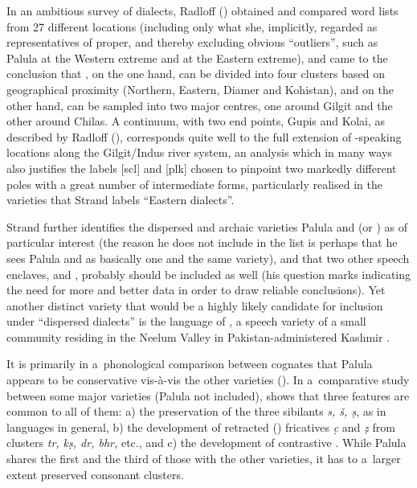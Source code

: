 In an ambitious survey of \iliShina dialects, Radloff (\citeyear{radloff1992}) obtained and compared word lists from 27 different locations (including only what she, implicitly, regarded as representatives of \iliShina proper, and thereby excluding obvious ``outliers'', such as Palula at the Western extreme and \iliBrokskat at the Eastern extreme), and came to the conclusion that \iliShina, on the one hand, can be divided into four clusters based on geographical proximity (Northern, Eastern, Diamer and Kohistan), and on the other hand, can be sampled into two major centres, one around Gilgit and the other around Chilas. A continuum, with two end points, Gupis and Kolai, as described by Radloff (\citeyear[132]{radloff1992}), corresponds quite well to the full extension of \iliShina-speaking locations along the Gilgit/Indus river system, an analysis which in many ways also justifies the labels [scl] and [plk] chosen to pinpoint two markedly different poles with a great number of intermediate forms, particularly realised in the varieties that Strand labels ``Eastern dialects''.      


Strand further identifies the dispersed and archaic varieties Palula and \iliSawi [sdg] (or \iliSauji) as of particular interest (the reason he does not include \iliSawi in the list is perhaps that he sees Palula and \iliSawi as basically one and the same variety), and that two other speech enclaves, \iliUshojo and \iliKalkoti, probably should be included as well (his question marks indicating the need for more and better data in order to draw reliable conclusions). Yet another distinct variety that would be a highly likely candidate for inclusion under ``dispersed dialects'' is the language of \iliKundalShahi [shd], a speech variety of a small community residing in the Neelum Valley in Pakistan-administered Kashmir \citep{baartrehman2005}.


It is primarily in a~phonological comparison between cognates that Palula appears to be conservative vis-à-vis the other \iliShina varieties (). In a~comparative study between some major varieties (Palula not included), \citet[36]{schmidt2004} shows that three features are common to all of them: a) the preservation of the \iliOIA three sibilants \textit{s, š, ṣ}, as in \iliHKIA languages in general, b) the development of retracted () fricatives \textit{c̣} and \textit{ẓ} from \iliOIA clusters \textit{tr, kṣ, dr, bhr,} etc., and c) the development of contrastive . While Palula shares the first and the third of those with the other varieties, it has to a~larger extent preserved consonant clusters. 


